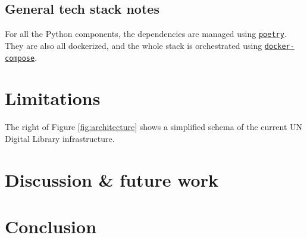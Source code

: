 \documentclass[11pt]{article}
\begin{document}


\subsection{General tech stack notes} \label{ssec:general-tech-stack-notes}

For all the Python components, the dependencies are managed using \href{https://github.com/python-poetry/poetry}{\texttt{poetry}}. They are also all dockerized, and the whole stack is orchestrated using \href{https://docs.docker.com/compose/}{\texttt{docker-compose}}.

\section{Limitations} \label{sec:limitations}


The right of Figure \ref{fig:architecture} shows a simplified schema of the current UN Digital Library infrastructure.


\section{Discussion \& future work} \label{sec:discussion-future-work}

\section*{Conclusion} \label{sec:conclusion}
\end{document}
